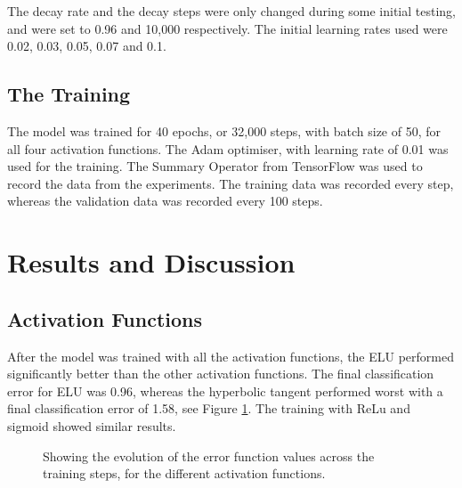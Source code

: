 \documentclass[]{article}
\begin{document}
The decay rate and the decay steps were only changed during some initial testing, and were set to 0.96 and 10,000 respectively. The initial learning rates used were 0.02, 0.03, 0.05, 0.07 and 0.1. 

\subsection{The Training}

The model was trained for 40 epochs, or 32,000 steps, with batch size of 50, for all four activation functions. The Adam optimiser, with learning rate of 0.01 was used for the training. The Summary Operator from TensorFlow was used to record the data from the experiments. The training data was recorded every step, whereas the validation data was recorded every 100 steps.

\section{Results and Discussion}

\subsection{Activation Functions}

After the model was trained with all the activation functions, the ELU performed significantly better than the other activation functions. The final classification error for ELU was 0.96, whereas the hyperbolic tangent performed worst with a final classification error of 1.58, see Figure \ref{res-activ}. The training with ReLu and sigmoid showed similar results. 


\begin{figure}[h]
	\centering
	
	\caption{Showing the evolution of the error function values across the training steps, for the different activation functions.}
	\label{res-activ}
\end{figure}
\end{document}

